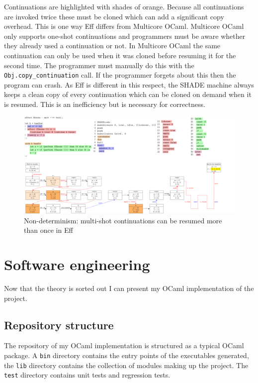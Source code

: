 \documentclass[class=article, crop=false]{standalone}
\begin{document}
Continuations are highlighted with shades of orange. Because all continuations
are invoked twice these must be cloned which can add a significant copy overhead.
This is one way Eff differs from Multicore OCaml. Multicore OCaml only supports
one-shot continuations and programmers must be aware whether they already used
a continuation or not. In Multicore OCaml the same continuation can only be used
when it was cloned before resuming it for the second time. The programmer must
manually do this with the \lstinline|Obj.copy_continuation| call. If the
programmer forgets about this then the program can crash. As Eff is different
in this respect, the SHADE machine always keeps a clean copy of every
continuation which can be cloned on demand when it is resumed.
This is an inefficiency but is necessary for correctness.

\begin{landscape}
    \begin{figure}
        \centering
        \includegraphics[width=\paperwidth]{../figures/impl-two-resume.pdf}
        \caption{Non-determinism: multi-shot continuations can be resumed more than once in Eff}
        \label{fig:shadecode-two-resume}
    \end{figure}
\end{landscape}

\section{Software engineering}

Now that the theory is sorted out I can present my OCaml implementation of the
project.

\subsection{Repository structure}

The repository of my OCaml implementation is structured as a typical OCaml
package. A \verb|bin| directory contains the entry points of the executables
generated, the \verb|lib| directory contains the collection of modules making
up the project. The \verb|test| directory contains unit tests and regression
tests.
\end{document}
